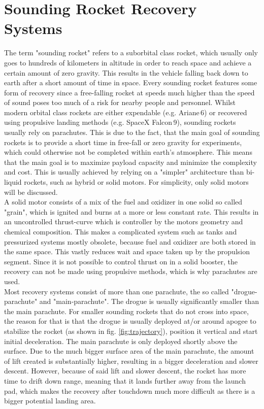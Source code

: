 \documentclass[fontsize=11pt,%
twoside,%
BCOR          = 8mm, %
DIV           = 11,  %
titlepage     = off,%
index=totoc,%
xcolor        = pdftex,%
dvipsnames,%
bibliography  = totoc,%
bibliography = numbered, %
listof        = notnumbered]{scrreprt}
\begin{document}
\section{Sounding Rocket Recovery Systems}
The term "sounding rocket" refers to a suborbital class rocket, which usually only goes to hundreds of kilometers in altitude in order to reach space and achieve a certain amount of zero gravity. This results in the vehicle falling back down to earth after a short amount of time in space. Every sounding rocket features some form of recovery since a free-falling rocket at speeds much higher than the speed of sound poses too much of a risk for nearby people and personnel. Whilst modern orbital class rockets are either expendable (e.g. Ariane\,6) or recovered using propulsive landing methods (e.g. SpaceX Falcon\,9), sounding rockets usually rely on parachutes. This is due to the fact, that the main goal of sounding rockets is to provide a short time in free-fall or zero gravity for experiments\cite{DLRsoundingRockets}, which could otherwise not be completed within earth's atmosphere. This means that the main goal is to maximize payload capacity and minimize the complexity and cost. This is usually achieved by relying on a "simpler" architecture than bi-liquid rockets, such as hybrid or solid motors. For simplicity, only solid motors will be discussed.\\
A solid motor consists of a mix of the fuel and oxidizer in one solid so called "grain", which is ignited and burns at a more or less constant rate. This results in an uncontrolled thrust-curve which is controller by the motors geometry and chemical composition. This makes a complicated system such as tanks and pressurized systems mostly obsolete, because fuel and oxidizer are both stored in the same space. This vastly reduces wait and space taken up by the propulsion segment. Since it is not possible to control thrust on in a solid booster, the recovery can not be made using propulsive methods, which is why parachutes are used.\\
Most recovery systems consist of more than one parachute, the so called "drogue-parachute" and "main-parachute". The drogue is usually significantly smaller than the main parachute.
For smaller sounding rockets that do not cross into space, the reason for that is that the drogue is usually deployed at/or around apogee to stabilize the rocket (as shown in fig. \ref{fig:trajectory}), position it vertical and start initial deceleration\cite{DelftParachute}. The main parachute is only deployed shortly above the surface. Due to the much bigger surface area of the main parachute, the amount of lift created is substantially higher, resulting in a bigger deceleration and slower descent. However, because of said lift and slower descent, the rocket has more time to drift down range, meaning that it lands further away from the launch pad, which makes the recovery after touchdown much more difficult as there is a bigger potential landing area.\\
\end{document}
